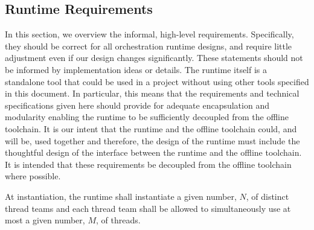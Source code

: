 \documentclass{article}
\begin{document}
%
%
%
%
%

\subsection{Runtime Requirements}
In this section, we overview the informal, high-level
requirements.  Specifically, they should be correct for all orchestration
runtime designs, and require little adjustment even if our design changes
significantly.  These statements should not be informed by
implementation ideas or details.  The runtime itself is a standalone
tool that could be used in a project without using other tools specified in this
document.  In particular, this means that the requirements and technical
specifications given here should provide for adequate encapsulation and
modularity enabling the runtime to be sufficiently decoupled from the offline
toolchain.  It is our intent that the runtime and the offline
toolchain could, and will be, used together and therefore, the design of the
runtime must include the thoughtful design of the interface between the runtime
and the offline toolchain.  It is intended that these requirements
be decoupled from the offline toolchain where possible.


\begin{req}
At instantiation, the runtime shall instantiate a given number, $N$, of distinct
thread teams and each thread team shall be allowed to simultaneously use
at most a given number, $M$, of threads.
\end{req}
\end{document}
